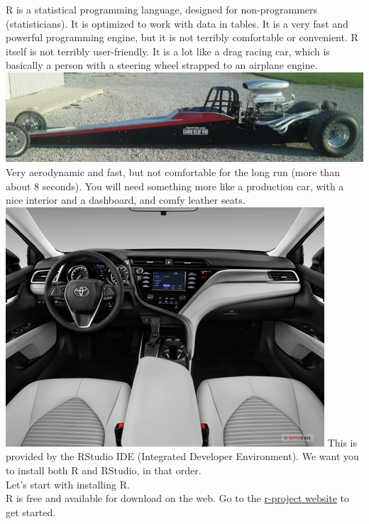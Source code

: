 \documentclass[
]{book}
\begin{document}
R is a statistical programming language, designed for non-programmers (statisticians). It is optimized to work with data in tables. It is a very fast and powerful programming engine, but it is not terribly comfortable or convenient. R itself is not terribly user-friendly. It is a lot like a drag racing car, which is basically a person with a steering wheel strapped to an airplane engine.
\includegraphics{images/drag.png}
Very aerodynamic and fast, but not comfortable for the long run (more than about 8 seconds).
You will need something more like a production car, with a nice interior and a dashboard, and comfy leather seats.
\includegraphics{images/dashboard.png}
This is provided by the RStudio IDE (Integrated Developer Environment). We want you to install both R and RStudio, in that order.\\
Let's start with installing R.\\
R is free and available for download on the web. Go to the \href{https://r-project.org/}{r-project website} to get started.
\end{document}
